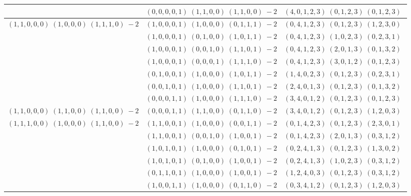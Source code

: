 \documentclass[11pt]{article}
\begin{document}
\begin{longtable}[l]{|c|c|c|}
 \cline{2-3} 
 & $(0 ,0 ,0 ,0 ,1) \;(1 ,1 ,0 ,0) \;(1 ,1 ,0 ,0) \;-2$ & $(4 ,0 ,1 ,2 ,3) \;(0 ,1 ,2 ,3) \;(0 ,1 ,2 ,3) \;$\\ \hline\multirow[t]{7}{*}{ $(1 ,1 ,0 ,0 ,0) \;(1 ,0 ,0 ,0) \;(1 ,1 ,1 ,0) \;-2$ }  & $(1 ,0 ,0 ,0 ,1) \;(1 ,0 ,0 ,0) \;(0 ,1 ,1 ,1) \;-2$ & $(0 ,4 ,1 ,2 ,3) \;(0 ,1 ,2 ,3) \;(1 ,2 ,3 ,0) \;$\\ 
 \cline{2-3} 
 & $(1 ,0 ,0 ,0 ,1) \;(0 ,1 ,0 ,0) \;(1 ,0 ,1 ,1) \;-2$ & $(0 ,4 ,1 ,2 ,3) \;(1 ,0 ,2 ,3) \;(0 ,2 ,3 ,1) \;$\\ 
 \cline{2-3} 
 & $(1 ,0 ,0 ,0 ,1) \;(0 ,0 ,1 ,0) \;(1 ,1 ,0 ,1) \;-2$ & $(0 ,4 ,1 ,2 ,3) \;(2 ,0 ,1 ,3) \;(0 ,1 ,3 ,2) \;$\\ 
 \cline{2-3} 
 & $(1 ,0 ,0 ,0 ,1) \;(0 ,0 ,0 ,1) \;(1 ,1 ,1 ,0) \;-2$ & $(0 ,4 ,1 ,2 ,3) \;(3 ,0 ,1 ,2) \;(0 ,1 ,2 ,3) \;$\\ 
 \cline{2-3} 
 & $(0 ,1 ,0 ,0 ,1) \;(1 ,0 ,0 ,0) \;(1 ,0 ,1 ,1) \;-2$ & $(1 ,4 ,0 ,2 ,3) \;(0 ,1 ,2 ,3) \;(0 ,2 ,3 ,1) \;$\\ 
 \cline{2-3} 
 & $(0 ,0 ,1 ,0 ,1) \;(1 ,0 ,0 ,0) \;(1 ,1 ,0 ,1) \;-2$ & $(2 ,4 ,0 ,1 ,3) \;(0 ,1 ,2 ,3) \;(0 ,1 ,3 ,2) \;$\\ 
 \cline{2-3} 
 & $(0 ,0 ,0 ,1 ,1) \;(1 ,0 ,0 ,0) \;(1 ,1 ,1 ,0) \;-2$ & $(3 ,4 ,0 ,1 ,2) \;(0 ,1 ,2 ,3) \;(0 ,1 ,2 ,3) \;$\\ \hline\multirow[t]{1}{*}{ $(1 ,1 ,0 ,0 ,0) \;(1 ,1 ,0 ,0) \;(1 ,1 ,0 ,0) \;-2$ }  & $(0 ,0 ,0 ,1 ,1) \;(1 ,1 ,0 ,0) \;(0 ,1 ,1 ,0) \;-2$ & $(3 ,4 ,0 ,1 ,2) \;(0 ,1 ,2 ,3) \;(1 ,2 ,0 ,3) \;$\\ \hline\multirow[t]{10}{*}{ $(1 ,1 ,1 ,0 ,0) \;(1 ,0 ,0 ,0) \;(1 ,1 ,0 ,0) \;-2$ }  & $(1 ,1 ,0 ,0 ,1) \;(1 ,0 ,0 ,0) \;(0 ,0 ,1 ,1) \;-2$ & $(0 ,1 ,4 ,2 ,3) \;(0 ,1 ,2 ,3) \;(2 ,3 ,0 ,1) \;$\\ 
 \cline{2-3} 
 & $(1 ,1 ,0 ,0 ,1) \;(0 ,0 ,1 ,0) \;(1 ,0 ,0 ,1) \;-2$ & $(0 ,1 ,4 ,2 ,3) \;(2 ,0 ,1 ,3) \;(0 ,3 ,1 ,2) \;$\\ 
 \cline{2-3} 
 & $(1 ,0 ,1 ,0 ,1) \;(1 ,0 ,0 ,0) \;(0 ,1 ,0 ,1) \;-2$ & $(0 ,2 ,4 ,1 ,3) \;(0 ,1 ,2 ,3) \;(1 ,3 ,0 ,2) \;$\\ 
 \cline{2-3} 
 & $(1 ,0 ,1 ,0 ,1) \;(0 ,1 ,0 ,0) \;(1 ,0 ,0 ,1) \;-2$ & $(0 ,2 ,4 ,1 ,3) \;(1 ,0 ,2 ,3) \;(0 ,3 ,1 ,2) \;$\\ 
 \cline{2-3} 
 & $(0 ,1 ,1 ,0 ,1) \;(1 ,0 ,0 ,0) \;(1 ,0 ,0 ,1) \;-2$ & $(1 ,2 ,4 ,0 ,3) \;(0 ,1 ,2 ,3) \;(0 ,3 ,1 ,2) \;$\\ 
 \cline{2-3} 
 & $(1 ,0 ,0 ,1 ,1) \;(1 ,0 ,0 ,0) \;(0 ,1 ,1 ,0) \;-2$ & $(0 ,3 ,4 ,1 ,2) \;(0 ,1 ,2 ,3) \;(1 ,2 ,0 ,3) \;$\\ 

\end{longtable}
\end{document}
